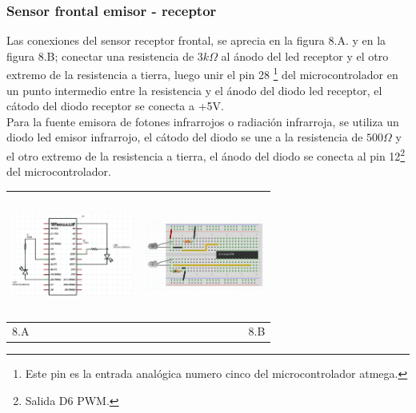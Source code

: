 \documentclass[12]{article}
\newenvironment{Figure}
{\par\medskip\noindent\minipage{\linewidth}}
{\endminipage\par\medskip}
\begin{document}
\begin{multicols}{2}
\subsubsection{Sensor frontal emisor - receptor}
Las conexiones del sensor receptor frontal, se aprecia en la figura 8.A. y en la figura 8.B; conectar una resistencia de $3 k\Omega$ al ánodo del led receptor y el otro extremo de la resistencia a tierra, luego unir el pin 28 \footnote{Este pin es la entrada analógica numero cinco del microcontrolador atmega.} del microcontrolador en un punto intermedio entre la resistencia y el ánodo del diodo led receptor, el cátodo del diodo receptor se conecta a +5V.\\
Para la  fuente emisora de fotones infrarrojos o radiación infrarroja, se utiliza un diodo led emisor infrarrojo, el cátodo del diodo se une  a la resistencia de $500 \Omega$ y el otro extremo de la resistencia a tierra, el ánodo del diodo se conecta al pin 12\footnote{Salida D6 PWM.} del microcontrolador.\\
\begin{Figure}
\center
\begin{tabular}{|l|r|}
\hline
\includegraphics[width=4cm, height=4cm]{img/ledesq.png} & \includegraphics[width=4cm, height=4cm]{img/ledmont.png} \\ \hline
8.A & 8.B \\ \hline
\end{tabular}
\label{fig:g8}
\end{Figure}

\end{multicols}
\end{document}

